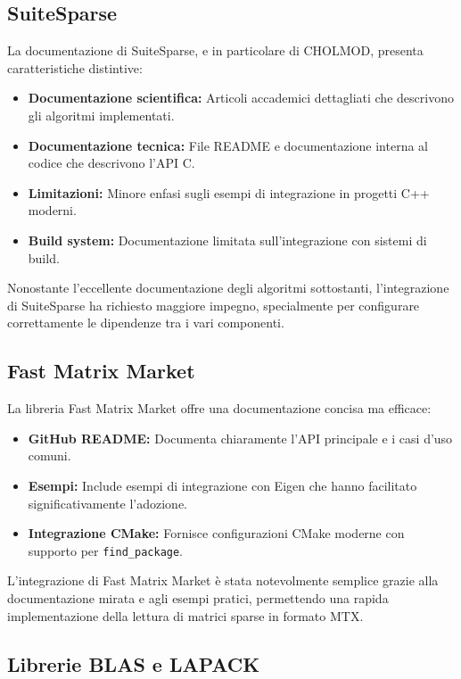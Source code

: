 \subsection{SuiteSparse}

La documentazione di SuiteSparse, e in particolare di CHOLMOD, presenta caratteristiche distintive:

\begin{itemize}
    \item \textbf{Documentazione scientifica:} Articoli accademici dettagliati che descrivono gli algoritmi implementati.
    \item \textbf{Documentazione tecnica:} File README e documentazione interna al codice che descrivono l'API C.
    \item \textbf{Limitazioni:} Minore enfasi sugli esempi di integrazione in progetti C++ moderni.
    \item \textbf{Build system:} Documentazione limitata sull'integrazione con sistemi di build.
\end{itemize}

Nonostante l'eccellente documentazione degli algoritmi sottostanti, l'integrazione di SuiteSparse ha richiesto maggiore impegno, 
specialmente per configurare correttamente le dipendenze tra i vari componenti.

\subsection{Fast Matrix Market}

La libreria Fast Matrix Market offre una documentazione concisa ma efficace:

\begin{itemize}
    \item \textbf{GitHub README:} Documenta chiaramente l'API principale e i casi d'uso comuni.
    \item \textbf{Esempi:} Include esempi di integrazione con Eigen che hanno facilitato significativamente l'adozione.
    \item \textbf{Integrazione CMake:} Fornisce configurazioni CMake moderne con supporto per \texttt{find\_package}.
\end{itemize}

L'integrazione di Fast Matrix Market è stata notevolmente semplice grazie alla documentazione mirata e agli esempi pratici, 
permettendo una rapida implementazione della lettura di matrici sparse in formato MTX.

\subsection{Librerie BLAS e LAPACK}

